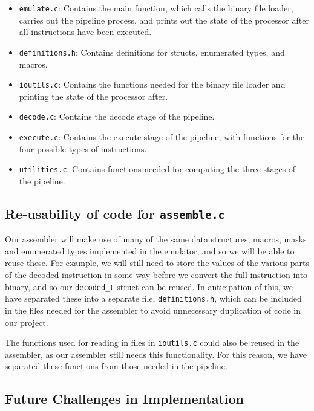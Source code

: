 \documentclass[11pt]{article}
\begin{document}
\begin{itemize}

\item \texttt{emulate.c}: Contains the main function, which calls the binary file loader, carries out the pipeline process, and prints out the state of the processor after all instructions have been executed.
\item \texttt{definitions.h}: Contains definitions for structs, enumerated types, and macros.
\item \texttt{ioutils.c}: Contains the functions needed for the binary file loader and printing the state of the processor after.
\item \texttt{decode.c}: Contains the decode stage of the pipeline.
\item \texttt{execute.c}: Contains the execute stage of the pipeline, with functions for the four possible types of instructions.
\item \texttt{utilities.c}: Contains functions needed for computing the  three stages of the pipeline.

\end{itemize}

\subsection{Re-usability of code for \texttt{assemble.c}}

Our assembler will make use of many of the same data structures, macros, masks and enumerated types implemented in the emulator, and so we will be able to reuse these. For example, we will still need to store the values of the various parts of the decoded instruction in some way before we convert the full instruction into binary, and so our \texttt{decoded\_t} struct can be reused. In anticipation of this, we have separated these into a separate file, \texttt{definitions.h}, which can be included in the files needed for the assembler to avoid unnecessary duplication of code in our project.

The functions used for reading in files in \texttt{ioutils.c} could also be reused in the assembler, as our assembler still needs this functionality. For this reason, we have separated these functions from those needed in the pipeline.

\subsection{Future Challenges in Implementation}
\end{document}
